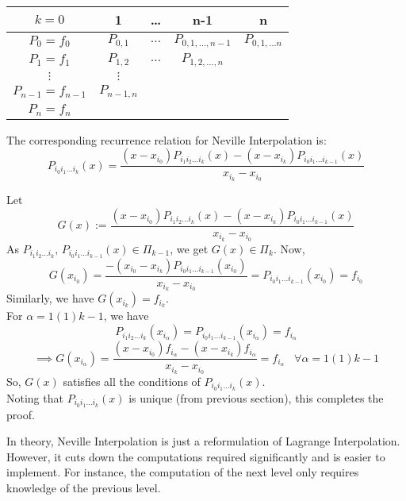 \begin{center}
	\begin{tabular}{|ccccc|}
		\hline
		$k = 0$              & 1           & \dots   & n-1                 & n                 \\
		\hline
		$ P_0 = f_0$         & $P_{0,1}$   & $\dots$ & $P_{0,1,\dots,n-1}$ & $P_{0,1,\dots n}$ \\
		$ P_1 = f_1$         & $P_{1,2}$   & $\dots$ & $P_{1,2,\dots,n}$   &                   \\
		$\vdots$             & $\vdots$    &         &                     &                   \\
		$ P_{n-1} = f_{n-1}$ & $P_{n-1,n}$ &         &                     &                   \\
		$ P_{n} = f_{n}$     &             &         &                     &                   \\
		\hline
	\end{tabular}
\end{center}



\begin{props}
	The corresponding recurrence relation for Neville Interpolation is:
	$$P_{i_0i_1\dots i_k}(x) = \frac{(x-x_{i_0})P_{i_1i_2\dots i_k}(x)-(x-x_{i_k})P_{i_0i_1\dots i_{k-1}}(x)}{x_{i_k} - x_{i_0}}$$
\end{props}
\begin{prf}
	Let $$G(x):=\frac{(x-x_{i_0})P_{i_1i_2\dots i_k}(x)-(x-x_{i_k})P_{i_0i_1\dots i_{k-1}}(x)}{x_{i_k} - x_{i_0}}$$
	As $P_{i_1i_2\dots i_k}\text{, }P_{i_0i_1\dots i_{k-1}}(x) \in \Pi_{k-1}$, we get $G(x) \in \Pi_k$.
	Now, $$G(x_{i_0}) = \frac{-(x_{i_0}-x_{i_k})P_{i_0i_1\dots i_{k-1}}(x_{i_0})}{x_{i_k} - x_{i_0}} =  P_{i_0i_1\dots i_{k-1}}(x_{i_0}) = f_{i_0}$$
	Similarly, we have $G(x_{i_k}) = f_{i_k}$.\\
	For $\alpha = 1(1)k-1$, we have
	$$P_{i_1i_2\dots i_k}(x_{i_\alpha}) = P_{i_0i_1\dots i_{k-1}}(x_{i_\alpha}) = f_{i_\alpha}$$
	$$\implies G(x_{i_\alpha}) = \frac{(x-x_{i_0})f_{i_\alpha}-(x-x_{i_k})f_{i_\alpha}}{x_{i_k} - x_{i_0}} = f_{i_\alpha}\;\;\;\forall \alpha = 1(1)k-1$$
	So, $G(x)$ satisfies all the conditions of $P_{i_0i_1\dots i_k}(x)$.\\
	Noting that $P_{i_0i_1\dots i_k}(x)$ is unique (from previous section), this completes the proof.
\end{prf}
\begin{rmk}
	In theory, Neville Interpolation is just a reformulation of Lagrange Interpolation. However, it cuts down the computations required significantly and is easier to implement. For instance, the computation of the next level only requires knowledge of the previous level.
\end{rmk}

